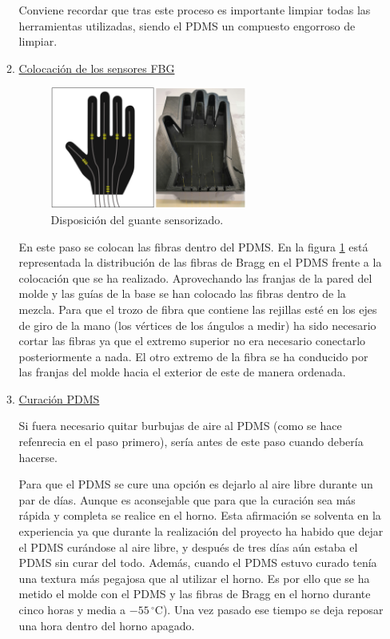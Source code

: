 \begin{itemize}
\begin{enumerate}
		
		Conviene recordar que tras este proceso es importante limpiar todas las herramientas utilizadas, siendo el PDMS un compuesto engorroso de limpiar. 
	
		
		\item \underline{Colocación de los sensores FBG}
		
		\begin{figure}[H]
			\centering
			\includegraphics[width=0.65\textwidth]{./img/diagramaMano2}
			\caption{Disposición del guante sensorizado.} \label{fig:manoFBG}
		\end{figure}
		
		En este paso se colocan las fibras dentro del PDMS. En la figura \ref{fig:manoFBG} está representada la distribución de las fibras de Bragg en el PDMS frente a la colocación que se ha realizado. Aprovechando las franjas de la pared del molde y las guías de la base se han colocado las fibras dentro de la mezcla. Para que el trozo de fibra que contiene las rejillas esté en los ejes de giro de la mano (los vértices de los ángulos a medir) ha sido necesario cortar las fibras ya que el extremo superior no era necesario conectarlo posteriormente a nada. El otro extremo de la fibra se ha conducido por las franjas del molde hacia el exterior de este de manera ordenada.
		
	
		\item \underline{Curación PDMS} 
		
		Si fuera necesario quitar burbujas de aire al PDMS (como se hace refenrecia en el paso primero), sería antes de este paso cuando debería hacerse.
		
		
		Para que el PDMS se cure una opción es dejarlo al aire libre durante un par de días. Aunque es aconsejable que para que la curación sea más rápida y completa se realice en el horno. Esta afirmación se solventa en la experiencia ya que durante la realización del proyecto ha habido que dejar el PDMS curándose al aire libre, y después de tres días aún estaba el PDMS sin curar del todo. Además, cuando el PDMS estuvo curado tenía una textura más pegajosa que al utilizar el horno. Es por ello que se ha metido el molde con el PDMS y las fibras de Bragg en el horno durante cinco horas y media a $-55\,^{\circ}\mathrm{C}$). Una vez pasado ese tiempo se deja reposar una hora dentro del horno apagado. 
		

\end{enumerate}
\end{itemize}
